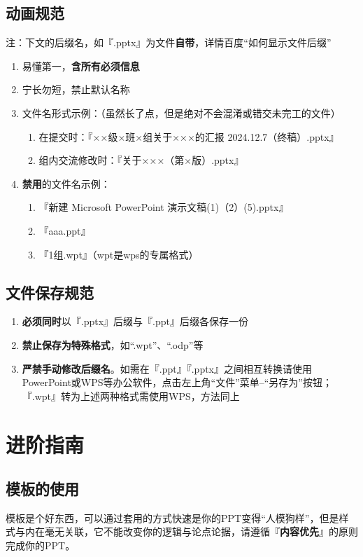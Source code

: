 \subsection[动画规范]{动画规范}
注：下文的后缀名，如『.pptx』为文件\textbf{自带}，详情百度“如何显示文件后缀”
\begin{enumerate}
    \item 易懂第一，\textbf{含所有必须信息}
    \item 宁长勿短，禁止默认名称
    \item 文件名形式示例：（虽然长了点，但是绝对不会混淆或错交未完工的文件）
          \begin{enumerate}
              \item 在提交时：『××级×班×组关于×××的汇报 2024.12.7（终稿）.pptx』
              \item 组内交流修改时：『关于×××（第×版）.pptx』
          \end{enumerate}
    \item \textbf{禁用}的文件名示例：
          \begin{enumerate}
              \item 『新建 Microsoft PowerPoint 演示文稿(1)（2）(5).pptx』
              \item 『aaa.ppt』
              \item 『1组.wpt』（wpt是wps的专属格式）
          \end{enumerate}
\end{enumerate}

\subsection[文件保存规范]{文件保存规范}
\begin{enumerate}
    \item \textbf{必须同时}以『.pptx』后缀与『.ppt』后缀各保存一份
    \item \textbf{禁止保存为特殊格式}，如“.wpt”、“.odp”等
    \item \textbf{严禁手动修改后缀名}。如需在『.ppt』『.pptx』之间相互转换请使用PowerPoint或WPS等办公软件，点击左上角“文件”菜单--“另存为”按钮；『.wpt』转为上述两种格式需使用WPS，方法同上
\end{enumerate}

\section[进阶指南]{进阶指南}
\subsection[模板的使用]{模板的使用}
模板是个好东西，可以通过套用的方式快速是你的PPT变得“人模狗样”，但是样式与内在毫无关联，它不能改变你的逻辑与论点论据，请遵循『\textbf{内容优先}』的原则完成你的PPT。

